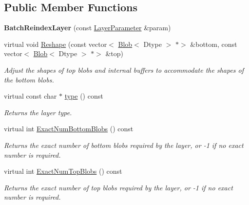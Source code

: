 \subsection*{Public Member Functions}
\begin{DoxyCompactItemize}
\item 
\mbox{\label{classcaffe_1_1_batch_reindex_layer_a5585d02e701ad89b5ef46ec9340af7b6}} 
{\bfseries Batch\+Reindex\+Layer} (const \mbox{\hyperlink{classcaffe_1_1_layer_parameter}{Layer\+Parameter}} \&param)
\item 
virtual void \mbox{\hyperlink{classcaffe_1_1_batch_reindex_layer_a7f69b6b19387959bf0926dde7a7922a4}{Reshape}} (const vector$<$ \mbox{\hyperlink{classcaffe_1_1_blob}{Blob}}$<$ Dtype $>$ $\ast$$>$ \&bottom, const vector$<$ \mbox{\hyperlink{classcaffe_1_1_blob}{Blob}}$<$ Dtype $>$ $\ast$$>$ \&top)
\begin{DoxyCompactList}\small\item\em Adjust the shapes of top blobs and internal buffers to accommodate the shapes of the bottom blobs. \end{DoxyCompactList}\item 
\mbox{\label{classcaffe_1_1_batch_reindex_layer_ab2a8d8b1a7953ca031d7638f1223b6c7}} 
virtual const char $\ast$ \mbox{\hyperlink{classcaffe_1_1_batch_reindex_layer_ab2a8d8b1a7953ca031d7638f1223b6c7}{type}} () const
\begin{DoxyCompactList}\small\item\em Returns the layer type. \end{DoxyCompactList}\item 
virtual int \mbox{\hyperlink{classcaffe_1_1_batch_reindex_layer_a4120d2fd610655c7ad3d846637564bc6}{Exact\+Num\+Bottom\+Blobs}} () const
\begin{DoxyCompactList}\small\item\em Returns the exact number of bottom blobs required by the layer, or -\/1 if no exact number is required. \end{DoxyCompactList}\item 
virtual int \mbox{\hyperlink{classcaffe_1_1_batch_reindex_layer_a7d5c537334359c2a83cce489fb534342}{Exact\+Num\+Top\+Blobs}} () const
\begin{DoxyCompactList}\small\item\em Returns the exact number of top blobs required by the layer, or -\/1 if no exact number is required. \end{DoxyCompactList}\item 

\end{DoxyCompactItemize}
